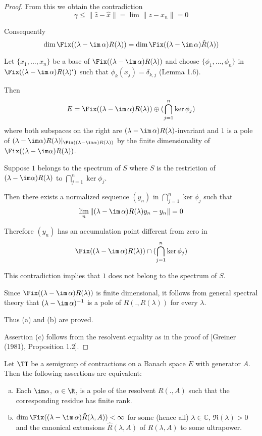 \begin{proof}
From this we obtain the contradiction
\[
\gamma \leq \|\hat{z} - \hat{x}\| = \lim \|z - x_{n}\| = 0
\]

Consequently
\[
\dim \Fix((\lambda - \im\,\alpha)R(\lambda)) = \dim \Fix((\lambda - \im\,\alpha)\hat{R}(\lambda))
\]

Let $\{x_{1},...,x_{n}\}$ be a base of $\Fix((\lambda - \im\,\alpha)R(\lambda))$ and choose $\{\phi_{1},...,\phi_{n}\}$ in $\Fix((\lambda - \im\,\alpha)R(\lambda)')$ such that $\phi_{k}(x_{j}) = \delta_{k,j}$ (Lemma 1.6).

Then
\[
E = \Fix((\lambda - \im\,\alpha)R(\lambda)) \oplus (\bigcap_{j=1}^{n} \ker\phi_{j})
\]
where both subspaces on the right are $(\lambda - \im\,\alpha)R(\lambda)$-invariant and $1$ is a pole of $(\lambda-\im\alpha)R(\lambda)|_{\Fix((\lambda-\im\alpha)R(\lambda))}$ by the finite dimensionality of $\Fix((\lambda-\im\alpha)R(\lambda))$.

Suppose $1$ belongs to the spectrum of $S$ where $S$ is the restriction of $(\lambda-\im\alpha)R(\lambda)$ to $\bigcap_{j=1}^{n} \ker\phi_{j}$.

Then there exists a normalized sequence $(y_{n})$ in $\bigcap_{j=1}^{n} \ker\phi_{j}$ such that
\[
\lim_{n} \|(\lambda - \im\,\alpha)R(\lambda)y_{n} - y_{n}\| = 0
\]

Therefore $(y_{n})$ has an accumulation point different from zero in
\[
\Fix((\lambda - \im\,\alpha)R(\lambda)) \cap (\bigcap_{j=1}^{n} \ker\phi_{j})
\]

This contradiction implies that $1$ does not belong to the spectrum of $S$.

Since $\Fix((\lambda - \im\,\alpha)R(\lambda))$ is finite dimensional, it follows from general spectral theory that $(\lambda - \im\,\alpha)^{-1}$ is a pole of $R(.,R(\lambda))$ for every $\lambda$.

Thus (a) and (b) are proved.

Assertion (c) follows from the resolvent equality as in the proof of [Greiner (1981), Proposition 1.2].

\end{proof}

\newpage


\begin{proposition}\label{prop:d3-2.3}
Let $\TT$ be a semigroup of contractions on a Banach space $E$ with generator $A$.
Then the following assertions are equivalent:
\begin{enumerate}[(a)]
\item
Each $\im\alpha$, $\alpha \in \R$, is a pole of the resolvent $R(.,A)$ such that the corresponding residue has finite rank.
\item
$\dim \Fix((\lambda - \im\,\alpha)\hat{R}(\lambda,A)) < \infty$ for some (hence all) $\lambda \in \mathbb{C}$, $\Re(\lambda) > 0$ and the canonical extensions $\hat{R}(\lambda,A)$ of $R(\lambda,A)$ to some ultrapower.
\end{enumerate}
\end{proposition}

